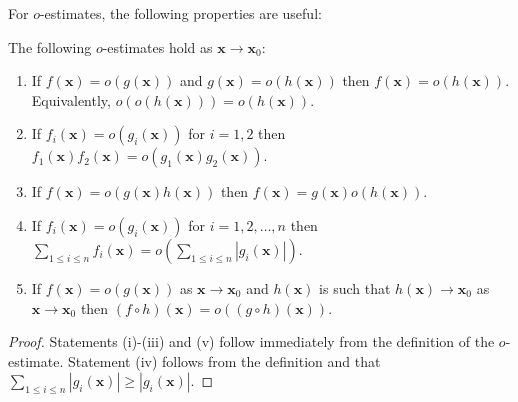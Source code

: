       For $o$-estimates, the following properties are useful:

      \begin{proposition}\label{prop:Little_Oh_manipulations}
          The following $o$-estimates hold as $\mathbf{x} \to \mathbf{x}_{0}$:
          \begin{enumerate}[label*=(\roman*)]
            \item If $f(\mathbf{x}) = o(g(\mathbf{x}))$ and $g(\mathbf{x}) = o(h(\mathbf{x}))$ then $f(\mathbf{x}) = o(h(\mathbf{x}))$. Equivalently, $o(o(h(\mathbf{x}))) = o(h(\mathbf{x}))$.
            \item If $f_{i}(\mathbf{x}) = o(g_{i}(\mathbf{x}))$ for $i = 1,2$ then $f_{1}(\mathbf{x})f_{2}(\mathbf{x}) = o(g_{1}(\mathbf{x})g_{2}(\mathbf{x}))$.
            \item If $f(\mathbf{x}) = o(g(\mathbf{x})h(\mathbf{x}))$ then $f(\mathbf{x}) = g(\mathbf{x})o(h(\mathbf{x}))$.
            \item If $f_{i}(\mathbf{x}) = o(g_{i}(\mathbf{x}))$ for $i = 1,2,\ldots,n$ then $\sum_{1 \le i \le n}f_{i}(\mathbf{x}) = o\left(\sum_{1 \le i \le n}|g_{i}(\mathbf{x})|\right)$.
            \item If $f(\mathbf{x}) = o(g(\mathbf{x}))$ as $\mathbf{x} \to \mathbf{x}_{0}$ and $h(\mathbf{x})$ is such that $h(\mathbf{x}) \to \mathbf{x}_{0}$ as $\mathbf{x} \to \mathbf{x}_{0}$ then $(f \circ h)(\mathbf{x}) = o((g \circ h)(\mathbf{x}))$.
          \end{enumerate}
      \end{proposition}
      \begin{proof}
        Statements (i)-(iii) and (v) follow immediately from the definition of the $o$-estimate. Statement (iv) follows from the definition and that $\sum_{1 \le i \le n}|g_{i}(\mathbf{x})| \ge |g_{i}(\mathbf{x})|$.
      \end{proof}
